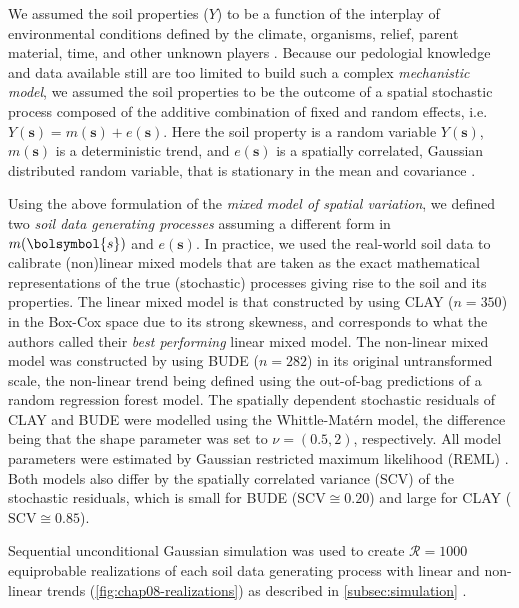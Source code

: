 We assumed the soil properties ($Y$) to be a function of the interplay of environmental conditions defined by 
the climate, organisms, relief, parent material, time, and other unknown players \cite{Jenny1994, 
McBratneyEtAl2003, Florinsky2012}. Because our pedologial knowledge and data available still are too limited 
to build such a complex \emph{mechanistic model}, we assumed the soil properties to be the outcome of a 
spatial stochastic process composed of the additive combination of fixed and random effects, i.e. 
$Y(\boldsymbol{s}) = m(\boldsymbol{s}) + e(\boldsymbol{s})$. Here the soil property is a random variable 
$Y(\boldsymbol{s})$, $m(\boldsymbol{s})$ is a deterministic trend, and $e(\boldsymbol{s})$ is a spatially 
correlated, Gaussian distributed random variable, that is stationary in the mean and covariance 
\cite{HeuvelinkEtAl2001}.

Using the above formulation of the \emph{mixed model of spatial variation}, we defined two \emph{soil 
data generating processes} assuming a different form in $m(\bolsymbol{s})$ and $e(\boldsymbol{s})$. In 
practice, we used the real-world soil data to calibrate (non)linear mixed models that are taken as the exact 
mathematical representations of the true (stochastic) processes giving rise to the soil and its properties. 
The linear mixed model is that constructed by \citet{Samuel-RosaEtAl2015} using CLAY ($n = 350$) in the 
Box-Cox space due to its strong skewness, and corresponds to what the authors called their \emph{best 
performing} linear mixed model. The non-linear mixed model was constructed by \citet{Samuel-RosaEtAl} using 
BUDE ($n = 282$) in its original untransformed scale, the non-linear trend being defined using the out-of-bag 
predictions of a random regression forest model. The spatially dependent stochastic residuals of CLAY and BUDE 
were modelled using the Whittle-Matérn model, the difference being that the shape parameter was set to $\nu = 
(0.5, 2)$, respectively. All model parameters were estimated by Gaussian restricted maximum likelihood (REML) 
\cite{LarkEtAl2004, DiggleEtAl2007}. Both models also differ by the spatially correlated variance (SCV) of the 
stochastic residuals, which is small for BUDE ($\text{SCV} \cong 0.20$) and large for CLAY ($\text{SCV} \cong 
0.85$).

Sequential unconditional Gaussian simulation was used to create $\mathcal{R} = 1000$ equiprobable realizations 
of each soil data generating process with linear and non-linear trends (\autoref{fig:chap08-realizations}) as 
described in \autoref{subsec:simulation} \cite{Samuel-RosaEtAl}.
 
